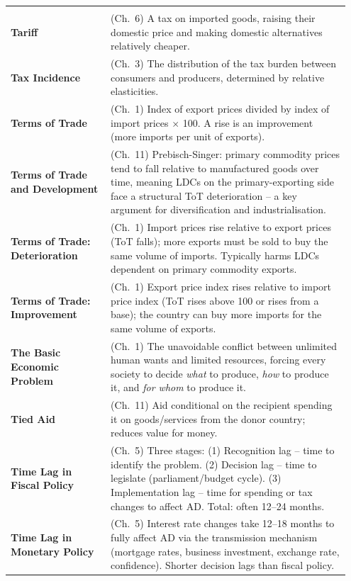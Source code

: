 \documentclass[11pt, a4paper, twoside]{book}
\begin{document}
\begin{longtable}{@{}>{\RaggedRight\arraybackslash}p{0.28\linewidth}>{\RaggedRight\arraybackslash}p{0.67\linewidth}@{}}
\multicolumn{2}{@{}l}{\textbf{\Large\color{CurveNavy} T}} \\[2pt]
\textbf{Tariff} & (Ch.~6) A tax on imported goods, raising their domestic price and making domestic alternatives relatively cheaper. \\
\textbf{Tax Incidence} & (Ch.~3) The distribution of the tax burden between consumers and producers, determined by relative elasticities. \\
\textbf{Terms of Trade} & (Ch.~1) Index of export prices divided by index of import prices $\times$ 100. A rise is an improvement (more imports per unit of exports). \\
\textbf{Terms of Trade and Development} & (Ch.~11) Prebisch-Singer: primary commodity prices tend to fall relative to manufactured goods over time, meaning LDCs on the primary-exporting side face a structural ToT deterioration -- a key argument for diversification and industrialisation. \\
\textbf{Terms of Trade: Deterioration} & (Ch.~1) Import prices rise relative to export prices (ToT falls); more exports must be sold to buy the same volume of imports. Typically harms LDCs dependent on primary commodity exports. \\
\textbf{Terms of Trade: Improvement} & (Ch.~1) Export price index rises relative to import price index (ToT rises above 100 or rises from a base); the country can buy more imports for the same volume of exports. \\
\textbf{The Basic Economic Problem} & (Ch.~1) The unavoidable conflict between unlimited human wants and limited resources, forcing every society to decide \textit{what} to produce, \textit{how} to produce it, and \textit{for whom} to produce it. \\
\textbf{Tied Aid} & (Ch.~11) Aid conditional on the recipient spending it on goods/services from the donor country; reduces value for money. \\
\textbf{Time Lag in Fiscal Policy} & (Ch.~5) Three stages: (1) Recognition lag -- time to identify the problem. (2) Decision lag -- time to legislate (parliament/budget cycle). (3) Implementation lag -- time for spending or tax changes to affect AD. Total: often 12--24 months. \\
\textbf{Time Lag in Monetary Policy} & (Ch.~5) Interest rate changes take 12--18 months to fully affect AD via the transmission mechanism (mortgage rates, business investment, exchange rate, confidence). Shorter decision lags than fiscal policy. \\

\end{longtable}
\end{document}
